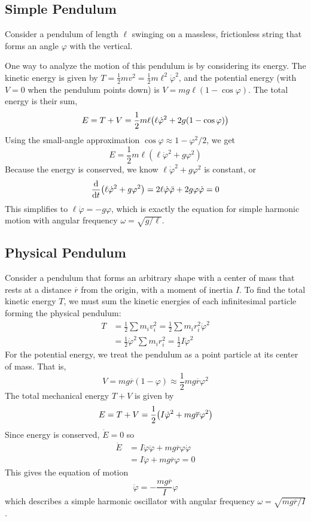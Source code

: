 \subsection*{Simple Pendulum}
Consider a pendulum of length $\ell$ swinging on a massless, frictionless string that forms an angle $\varphi$ with the vertical. 

One way to analyze the motion of this pendulum is by considering its energy. The kinetic energy is given by $T = \frac{1}{2}mv^2 = \frac{1}{2}m\ell^2\dot \varphi^2$, and the potential energy (with $V = 0$ when the pendulum points down) is $V = mg\ell(1 - \cos\varphi)$. The total energy is their sum,
\[ E = T+V = \frac{1}{2}m\ell\pqty{\ell\dot\varphi^2 + 2g(1-\cos\varphi)}\]
Using the small-angle approximation $\cos\varphi \approx 1- \varphi^2/2$, we get
\[ E = \frac{1}{2}m\ell(\ell \dot\varphi^2 + g\varphi^2)\]
Because the energy is conserved, we know $\ell\dot\varphi^2 + g\varphi^2$ is constant, or
\[ \dv{t} (\ell\dot\varphi^2 + g\varphi^2) = 2\ell \dot\varphi\ddot \varphi + 2g\varphi\dot\varphi = 0\]
This simplifies to $\ell\ddot\varphi = -g\varphi$, which is exactly the equation for simple harmonic motion with angular frequency $\omega = \sqrt{g/\ell}$.
\subsection*{Physical Pendulum}
Consider a pendulum that forms an arbitrary shape with a center of mass that rests at a distance $\overline r$ from the origin, with a moment of inertia $I$. To find the total kinetic energy $T$, we must sum the kinetic energies of each infinitesimal particle forming the physical pendulum:
\begin{align*}
    T &= \frac{1}{2}\sum m_iv_i^2 = \frac{1}{2}\sum m_i r_i^2\dot\varphi^2 \\
    &= \frac{1}{2}\dot\varphi^2\sum m_ir_i^2 = \frac{1}{2}I\dot\varphi^2
\end{align*}
For the potential energy, we treat the pendulum as a point particle at its center of mass. That is,
\[ V = mg\overline r(1-\varphi) \approx \frac{1}{2}mg\overline r \varphi^2\]
The total mechanical energy $T+V$ is given by
\[ E = T+V = \frac{1}{2}\pqty{I\dot\varphi^2 + mg\overline r\varphi^2}\]
Since energy is conserved, $\dot E = 0$ so
\begin{align*}
    \dot E &= I\dot\varphi \ddot\varphi + mg\overline r \varphi\dot\varphi \\
    &= I\ddot \varphi + mg\overline r \varphi = 0
\end{align*}
This gives the equation of motion
\[ \ddot\varphi = -\frac{mg\overline r}{I}\varphi \]
which describes a simple harmonic oscillator with angular frequency $\omega = \sqrt{mg\overline r/I}$.
